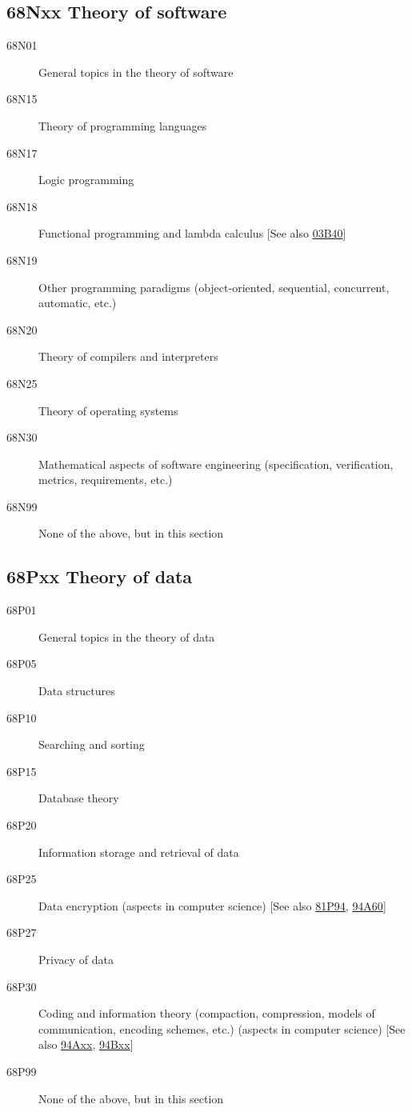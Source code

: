 \documentclass[letterpaper]{article}
\begin{document}
\subsection*{68Nxx  Theory of software }\label{68Nxx}
\begin{description}
\item [68N01]\label{68N01} General topics in the theory of software
\item [68N15]\label{68N15} Theory of programming languages
\item [68N17]\label{68N17} Logic programming
\item [68N18]\label{68N18} Functional programming and lambda calculus [See also \hyperref[03B40]{03B40}]
\item [68N19]\label{68N19} Other programming paradigms (object-oriented, sequential, concurrent, automatic, etc.)
\item [68N20]\label{68N20} Theory of compilers and interpreters
\item [68N25]\label{68N25} Theory of operating systems
\item [68N30]\label{68N30} Mathematical aspects of software engineering (specification, verification, metrics, requirements, etc.)
\item [68N99]\label{68N99} None of the above, but in this section
\end{description}
\subsection*{68Pxx  Theory of data }\label{68Pxx}
\begin{description}
\item [68P01]\label{68P01} General topics in the theory of data
\item [68P05]\label{68P05} Data structures
\item [68P10]\label{68P10} Searching and sorting
\item [68P15]\label{68P15} Database theory
\item [68P20]\label{68P20} Information storage and retrieval of data
\item [68P25]\label{68P25} Data encryption (aspects in computer science) [See also \hyperref[81P94]{81P94}, \hyperref[94A60]{94A60}]
\item [68P27]\label{68P27} Privacy of data
\item [68P30]\label{68P30} Coding and information theory (compaction, compression, models of communication, encoding schemes, etc.) (aspects in computer science) [See also \hyperref[94Axx]{94Axx}, \hyperref[94Bxx]{94Bxx}]
\item [68P99]\label{68P99} None of the above, but in this section
\end{description}
\end{document}
